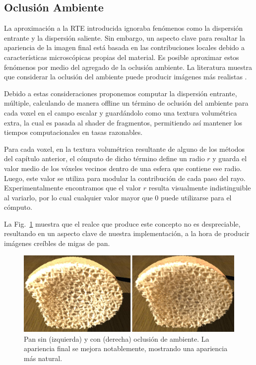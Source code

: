 \subsection{Oclusión Ambiente}

La aproximación a la RTE introducida ignoraba fenómenos como la dispersión entrante y la dispersión saliente.
Sin embargo, un aspecto clave para resaltar la apariencia de la imagen final está basada en las contribuciones locales debido a características microscópicas propias del material.
Es posible aproximar estos fenómenos por medio del agregado de la oclusión ambiente.
La literatura muestra que considerar la oclusión del ambiente puede producir imágenes más realistas \cite{Hernell2010}.

Debido a estas consideraciones proponemos computar la dispersión entrante, múltiple, calculando de manera offline un término de oclusión del ambiente para cada voxel en el campo escalar y guardándolo como una textura volumétrica extra, la cual es pasada al shader de fragmentos, permitiendo así mantener los tiempos computacionales en tasas razonables.

Para cada voxel, en la textura volumétrica resultante de alguno de los métodos del capítulo anterior, el cómputo de dicho término define un radio $r$ y guarda el valor medio de los vóxeles vecinos dentro de una esfera que contiene ese radio.
Luego, este valor se utiliza para modular la contribución de cada paso del rayo.
Experimentalmente encontramos que el valor $r$ resulta visualmente indistinguible al variarlo, por lo cual cualquier valor mayor que $0$ puede utilizarse para el cómputo.

La Fig.~\ref{fg:occlusion} muestra que el realce que produce este concepto no es despreciable, resultando en un aspecto clave de nuestra implementación, a la hora de producir imágenes creíbles de migas de pan. 



\begin{figure}
\centerline{\includegraphics[width=13cm]{figures/occlusion}}
  \caption[Pan renderizado sin y con oclusión de ambiente]{Pan sin (izquierda) y con (derecha) oclusión de ambiente. La apariencia final se mejora notablemente, mostrando una apariencia más natural.}
  \label{fg:occlusion}
\end{figure}
 
